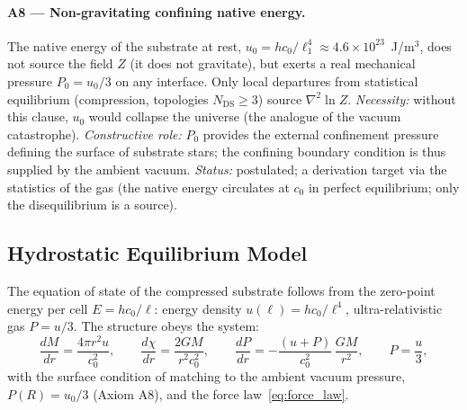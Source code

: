 \documentclass[11pt,a4paper]{article}
\theoremstyle{plain}
\theoremstyle{remark}
\newcommand{\Ncd}{\ensuremath{N_{\mathrm{DS}}}}
\begin{document}
\paragraph{A8 --- Non-gravitating confining native energy.}
The native energy of the substrate at rest, $u_0 = h c_0/\ell_1^4 \approx 4.6\times10^{23}$~J/m$^3$, does not source the field $Z$ (it does not gravitate), but exerts a real mechanical pressure $P_0 = u_0/3$ on any interface. Only local departures from statistical equilibrium (compression, topologies $\Ncd\geq3$) source $\nabla^2 \ln Z$. \emph{Necessity:} without this clause, $u_0$ would collapse the universe (the analogue of the vacuum catastrophe). \emph{Constructive role:} $P_0$ provides the external confinement pressure defining the surface of substrate stars; the confining boundary condition is thus supplied by the ambient vacuum. \emph{Status:} postulated; a derivation target via the statistics of the gas (the native energy circulates at $c_0$ in perfect equilibrium; only the disequilibrium is a source).

\subsection{Hydrostatic Equilibrium Model}
The equation of state of the compressed substrate follows from the zero-point energy per cell $E = hc_0/\ell$: energy density $u(\ell) = hc_0/\ell^4$, ultra-relativistic gas $P = u/3$. The structure obeys the system:
\begin{equation}\label{eq:star_structure}
\frac{dM}{dr} = \frac{4\pi r^2 u}{c_0^2}, \qquad
\frac{d\chi}{dr} = \frac{2GM}{r^2 c_0^2}, \qquad
\frac{dP}{dr} = -\frac{(u+P)}{c_0^2}\,\frac{GM}{r^2}, \qquad P = \frac{u}{3},
\end{equation}
with the surface condition of matching to the ambient vacuum pressure, $P(R) = u_0/3$ (Axiom A8), and the force law~\eqref{eq:force_law}.
\end{document}
